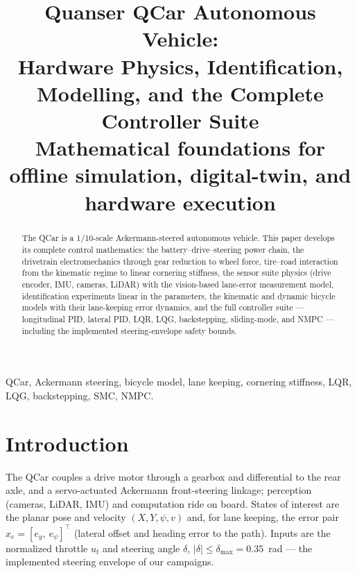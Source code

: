\documentclass[conference]{IEEEtran}
\begin{document}
\title{Quanser QCar Autonomous Vehicle:\\ Hardware Physics, Identification, Modelling, and the Complete Controller Suite\\
{\footnotesize Mathematical foundations for offline simulation, digital-twin, and hardware execution}}

\author{
}

\maketitle

\begin{abstract}
The QCar is a 1/10-scale Ackermann-steered autonomous vehicle. This paper develops its complete control mathematics: the battery--drive--steering power chain, the drivetrain electromechanics through gear reduction to wheel force, tire--road interaction from the kinematic regime to linear cornering stiffness, the sensor suite physics (drive encoder, IMU, cameras, LiDAR) with the vision-based lane-error measurement model, identification experiments linear in the parameters, the kinematic and dynamic bicycle models with their lane-keeping error dynamics, and the full controller suite --- longitudinal PID, lateral PID, LQR, LQG, backstepping, sliding-mode, and NMPC --- including the implemented steering-envelope safety bounds.
\end{abstract}

\begin{IEEEkeywords}
QCar, Ackermann steering, bicycle model, lane keeping, cornering stiffness, LQR, LQG, backstepping, SMC, NMPC.
\end{IEEEkeywords}

\section{Introduction}
The QCar couples a drive motor through a gearbox and differential to the rear axle, and a servo-actuated Ackermann front-steering linkage; perception (cameras, LiDAR, IMU) and computation ride on board. States of interest are the planar pose and velocity $(X, Y, \psi, v)$ and, for lane keeping, the error pair $x_e = [e_y,\ e_\psi]^{\!\top}$ (lateral offset and heading error to the path). Inputs are the normalized throttle $u_t$ and steering angle $\delta$, $|\delta|\le\delta_{\max} = 0.35$~rad --- the implemented steering envelope of our campaigns.
\end{document}
